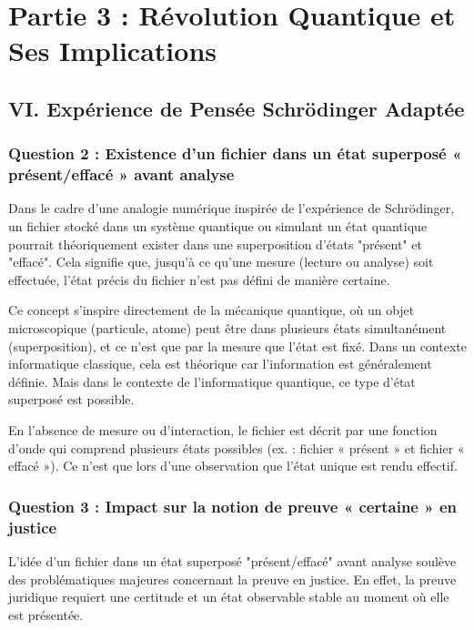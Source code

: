 \documentclass[12pt, a4paper]{article}
\begin{document}
		\section*{Partie 3 : Révolution Quantique et Ses Implications}
		
		\subsection*{VI. Expérience de Pensée Schrödinger Adaptée}
		
		\subsubsection*{Question 2 : Existence d'un fichier dans un état superposé « présent/effacé » avant analyse}
		
		Dans le cadre d'une analogie numérique inspirée de l'expérience de Schrödinger, un fichier stocké dans un système quantique ou simulant un état quantique pourrait théoriquement exister dans une superposition d'états "présent" et "effacé". Cela signifie que, jusqu'à ce qu'une mesure (lecture ou analyse) soit effectuée, l'état précis du fichier n'est pas défini de manière certaine.
		
		Ce concept s'inspire directement de la mécanique quantique, où un objet microscopique (particule, atome) peut être dans plusieurs états simultanément (superposition), et ce n'est que par la mesure que l'état est fixé. Dans un contexte informatique classique, cela est théorique car l'information est généralement définie. Mais dans le contexte de l'informatique quantique, ce type d'état superposé est possible.
		
		En l'absence de mesure ou d'interaction, le fichier est décrit par une fonction d'onde qui comprend plusieurs états possibles (ex. : fichier « présent » et fichier « effacé »). Ce n'est que lors d'une observation que l'état unique est rendu effectif.
		
		\subsubsection*{Question 3 : Impact sur la notion de preuve « certaine » en justice}
		
		L'idée d'un fichier dans un état superposé "présent/effacé" avant analyse soulève des problématiques majeures concernant la preuve en justice. En effet, la preuve juridique requiert une certitude et un état observable stable au moment où elle est présentée.
		
\end{document}

